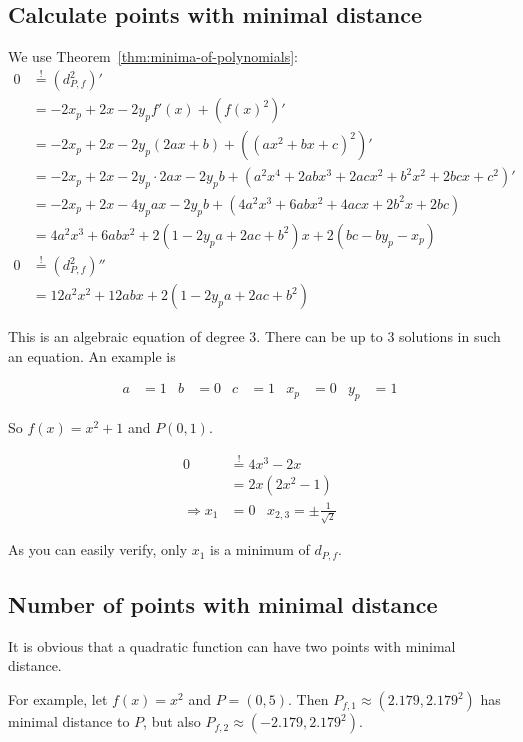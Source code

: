 \documentclass[a4paper]{scrartcl}
\theoremstyle{break}
\theoremstyle{nonumberplain}
\begin{document}
\subsection{Calculate points with minimal distance}
We use Theorem~\ref{thm:minima-of-polynomials}:\nobreak
\begin{align}
    0     &\stackrel{!}{=} (d_{P,f}^2)'\\
          &= -2 x_p + 2x -2y_p f'(x) + \left (f(x)^2 \right )'\label{eq:minimizingFirstDerivative}\\
          &= -2 x_p + 2x -2y_p (2ax+b) + ((ax^2+bx+c)^2)'\\
          &= -2 x_p + 2x -2y_p \cdot 2ax-2 y_p b + (a^2 x^4+2 a b x^3+2 a c x^2+b^2 x^2+2 b c x+c^2)'\\
          &= -2 x_p + 2x -4y_p ax-2 y_p b + (4a^2 x^3 + 6 ab x^2 + 4acx + 2b^2 x + 2bc)\\
          &= 4a^2 x^3 + 6 ab x^2 + 2(1 -2y_p a+ 2ac + b^2)x +2(bc-by_p-x_p)\\
    0     &\stackrel{!}{=}(d_{P,f}^2)''\\
          &= 12a^2 x^2 + 12abx + 2(1 -2y_p a+ 2ac + b^2)
\end{align}



This is an algebraic equation of degree 3.
There can be up to 3 solutions in such an equation. An example is

\begin{align*}
    a &= 1 &  b &= 0  & c &= 1  & x_p &= 0 & y_p &= 1
\end{align*}

So $f(x) = x^2 + 1$ and $P(0, 1)$.

\begin{align}
    0 &\stackrel{!}{=} 4 x^3 - 2x\\
      &=2x(2x^2 - 1)\\
    \Rightarrow x_1 &= 0 \;\;\; x_{2,3} = \pm \frac{1}{\sqrt{2}}
\end{align}

As you can easily verify, only $x_1$ is a minimum of $d_{P,f}$.


\subsection{Number of points with minimal distance}
It is obvious that a quadratic function can have two points with 
minimal distance. 

For example, let $f(x) = x^2$ and $P = (0,5)$. Then $P_{f,1} \approx (2.179, 2.179^2)$
has minimal distance to $P$, but also $P_{f,2}\approx (-2.179, 2.179^2)$.
\end{document}
